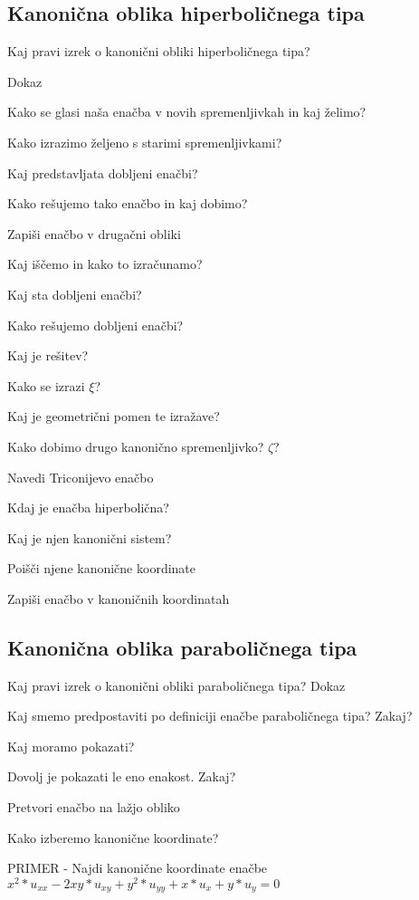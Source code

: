 \documentclass{article}
\begin{document}
    \subsection{Kanonična oblika hiperboličnega tipa}
    \begin{enumerate}
        \item Kaj pravi izrek o kanonični obliki hiperboličnega tipa?
        
        Dokaz
        \item Kako se glasi naša enačba v novih spremenljivkah in kaj želimo?
        {\color{red}\item Kako izrazimo željeno s starimi spremenljivkami?}
        {\color{red}\item Kaj predstavljata dobljeni enačbi?}
        {\color{red}\item Kako rešujemo tako enačbo in kaj dobimo?}
        \item Zapiši enačbo v drugačni obliki
        \item Kaj iščemo in kako to izračunamo?
        \item Kaj sta dobljeni enačbi?
        {\color{red}\item Kako rešujemo dobljeni enačbi?}
        {\color{red}\item Kaj je rešitev?}
        {\color{red}\item Kako se izrazi $\xi$?}
        {\color{red}\item Kaj je geometrični pomen te izražave?}
        \item Kako dobimo drugo kanonično spremenljivko? $\zeta$?
        {\color{red}\item Navedi Triconijevo enačbo}
        \item Kdaj je enačba hiperbolična?
        \item Kaj je njen kanonični sistem?
        \item Poišči njene kanonične koordinate
        \item Zapiši enačbo v kanoničnih koordinatah
    \end{enumerate}

    \subsection{Kanonična oblika paraboličnega tipa}
    \begin{enumerate}
        \item Kaj pravi izrek o kanonični obliki paraboličnega tipa?
        Dokaz
        {\color{red}\item Kaj smemo predpostaviti po definiciji enačbe paraboličnega tipa? Zakaj?}
        \item Kaj moramo pokazati?
        {\color{red}\item Dovolj je pokazati le eno enakost. Zakaj?}
        \item Pretvori enačbo na lažjo obliko
        \item Kako izberemo kanonične koordinate?
        \item PRIMER - Najdi kanonične koordinate enačbe $x^2 * u_{xx} - 2xy * u_{xy} + y^2 * u_{yy} + x * u_x + y * u_y = 0$
    \end{enumerate}
\end{document}
